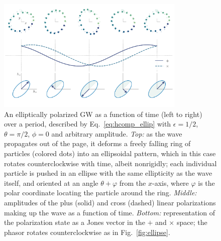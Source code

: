 \documentclass[aps,prd,twocolumn,superscriptaddress,preprintnumbers,floatfix,nofootinbib]{revtex4-2}
\begin{document}
\begin{figure}
\includegraphics[width=0.8\textwidth]{pol_diagram_ellip}
\caption{An elliptically polarized GW as a function of time (left to right) over a period, described by Eq.~\eqref{eq:hcomp_ellip} with $\epsilon=1/2$, $\theta=\pi/2$, $\phi=0$ and arbitrary amplitude. \emph{Top:} as the wave propagates out of the page, it deforms a freely falling ring of particles (colored dots) into an ellipsoidal pattern, which in this case rotates counterclockwise with time, albeit nonrigidly; each individual particle is pushed in an ellipse with the same ellipticity as the wave itself, and oriented at an angle $\theta + \varphi$ from the $x$-axis, where $\varphi$ is the polar coordinate locating the particle around the ring.
\emph{Middle:} amplitudes of the plus (solid) and cross (dashed) linear polarizations making up the wave as a function of time.
\emph{Bottom:} representation of the polarization state as a Jones vector in the $+$ and $\times$ space; the phasor rotates counterclockwise as in Fig.~\ref{fig:ellipse}.
}
\label{fig:pol_diagram_ellip}
\end{figure}
\end{document}
